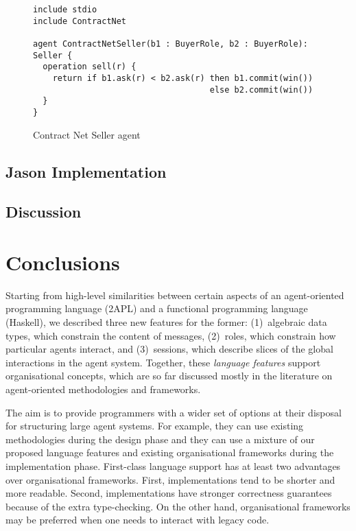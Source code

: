 \documentclass[a4paper,12pt,oneside,fleqn]{book} %
\begin{document}
\begin{figure}\footnotesize %
\begin{verbatim}
include stdio
include ContractNet

agent ContractNetSeller(b1 : BuyerRole, b2 : BuyerRole): Seller {
  operation sell(r) {
    return if b1.ask(r) < b2.ask(r) then b1.commit(win()) 
                                    else b2.commit(win())
  }
}
\end{verbatim}
\caption{Contract Net Seller agent}
\label{fig:contract-seller}
\end{figure} %

\section{Jason Implementation} %

\section{Discussion} %


\chapter{Conclusions}\label{ch:conc} %

Starting from high-level similarities between certain aspects of an
agent-oriented programming language (2APL) and a functional programming
language (Haskell), we described three new features for the former:
(1)~algebraic data types, which constrain the content of messages,
(2)~roles, which constrain how particular agents interact, and
(3)~sessions, which describe slices of the global interactions in the agent
system. Together, these \emph{language features} support organisational
concepts, which are so far discussed mostly in the literature on
agent-oriented methodologies and frameworks.

The aim is to provide programmers with a wider set of options at their disposal
for structuring large agent systems. For example, they can use existing
methodologies during the design phase and they can use a mixture of our
proposed language features and existing organisational frameworks during the
implementation phase. First-class language support has at least two
advantages over organisational frameworks. First, implementations tend to be
shorter and more readable. Second, implementations have stronger correctness
guarantees because of the extra type-checking. On the other hand,
organisational frameworks may be preferred when one needs to interact with
legacy code.
\end{document}
